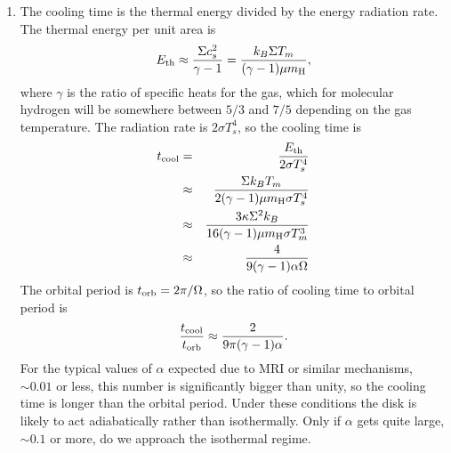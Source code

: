 \begin{enumerate}
\begin{enumerate}
\item The cooling time is the thermal energy divided by the energy radiation rate. The thermal energy per unit area is
\begin{displaymath}
E_{\rm th} \approx \frac{\Sigma c_s^2}{\gamma-1} = \frac{k_B \Sigma T_m}{(\gamma-1)\mu m_{\rm H}},
\end{displaymath}
where $\gamma$ is the ratio of specific heats for the gas, which for molecular hydrogen will be somewhere between $5/3$ and $7/5$ depending on the gas temperature. The radiation rate is $2\sigma T_s^4$, so the cooling time is
\begin{eqnarray*}
t_{\rm cool} & = & \frac{E_{\rm th}}{2\sigma T_s^4} \\
& \approx & \frac{\Sigma k_B T_m}{2(\gamma-1)\mu m_{\rm H} \sigma T_s^4} \\
& \approx & \frac{3 \kappa \Sigma^2 k_B}{16(\gamma-1)\mu m_{\rm H} \sigma T_m^3} \\
& \approx & \frac{4}{9 (\gamma-1) \alpha \Omega}
\end{eqnarray*}
The orbital period is $t_{\rm orb} = 2\pi/\Omega$, so the ratio of cooling time to orbital period is
\begin{displaymath}
\frac{t_{\rm cool}}{t_{\rm orb}} \approx \frac{2}{9\pi(\gamma-1)\alpha}.
\end{displaymath}
For the typical values of $\alpha$ expected due to MRI or similar mechanisms, $\sim 0.01$ or less, this number is significantly bigger than unity, so the cooling time is longer than the orbital period. Under these conditions the disk is likely to act adiabatically rather than isothermally. Only if $\alpha$ gets quite large, $\sim 0.1$ or more, do we approach the isothermal regime.


\end{enumerate}
\end{enumerate}
